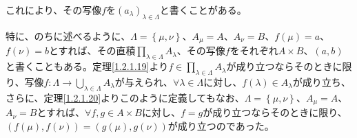 \documentclass[a4paper]{jsarticle}
\begin{document}
これにより、その写像$f$を$\left( a_{\lambda} \right)_{\lambda \in \varLambda}$と書くことがある。\par
特に、のちに述べるように、$\varLambda = \left\{ \mu,\nu \right\}$、$A_{\mu} = A$、$A_{\nu} = B$、$f(\mu) = a$、$f(\nu) = b$とすれば、その直積$\prod_{\lambda \in \varLambda} A_{\lambda}$、その写像$f$をそれぞれ$A \times B$、$(a,b)$と書くこともある。定理\ref{1.2.1.19}より$f \in \prod_{\lambda \in \varLambda} A_{\lambda}$が成り立つならそのときに限り、写像$f:\varLambda \rightarrow \bigcup_{\lambda \in \varLambda} A_{\lambda}$が与えられ、$\forall\lambda \in \varLambda$に対し、$f(\lambda) \in A_{\lambda}$が成り立ち、さらに、定理\ref{1.2.1.20}よりこのように定義してもなお、$\varLambda = \left\{ \mu,\nu \right\}$、$A_{\mu} = A$、$A_{\nu} = B$とすれば、$\forall f,g \in A \times B$に対し、$f = g$が成り立つならそのときに限り、$\left( f(\mu),f(\nu) \right) = \left( g(\mu),g(\nu) \right)$が成り立つのであった。
\end{document}

